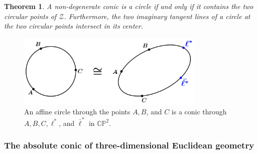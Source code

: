 \documentclass[10pt, a4paper]{article}
\theoremstyle{BoldTopSpacing}
\newtheorem{theorem}{Theorem}[section]
\theoremstyle{BoldTopSpacing}
\theoremstyle{BoldTopSpacing}
\theoremstyle{BoldTopBottomSpacing}
\theoremstyle{BoldTopSpacing}
\theoremstyle{BoldTopBottomSpacing}
\theoremstyle{remark}
\begin{document}
\begin{theorem}
\label{thm:conic-through-circular-points}
A non-degenerate conic is a circle if and only if it contains the two circular points of $\mathcal{Z}$. Furthermore, the two imaginary tangent lines of a circle at the two circular points intersect in its center.
\end{theorem}

\begin{figure}[H]
    \centering
    \includegraphics[width=0.8\textwidth]{three-points-determine-a-circle.png}
\caption[Circles are conics through the circular points at infinity.]{An affine circle through the points $A, B$, and $C$ is a conic through $A, B, C, \ell^{*}$, and $\bar{\ell}^{*}$ in $\mathbb{C}\mathbb{P}^2$.}
    \label{fig:three-points-determine-a-circle}
\end{figure}

\subsubsection{The absolute conic of three-dimensional Euclidean geometry}
\label{subsubsec:absolute-conic-three-dimensional}
\end{document}

